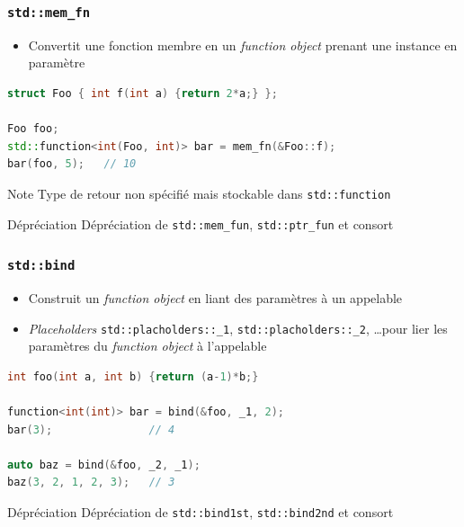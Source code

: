 \documentclass[C++.tex]{subfiles}
\begin{document}
\begin{frame}[fragile]
	\frametitle{\lstinline|std::mem_fn|}
	\begin{itemize}
		\item Convertit une fonction membre en un \textit{function object} prenant une instance en paramètre
	\end{itemize}

	\begin{lstlisting}[language=C++]
struct Foo { int f(int a) {return 2*a;} };

Foo foo;
std::function<int(Foo, int)> bar = mem_fn(&Foo::f);
bar(foo, 5);   // 10\end{lstlisting}

	\begin{block}{Note}
		Type de retour non spécifié mais stockable dans \lstinline|std::function|
	\end{block}

	\begin{block}{Dépréciation}
		Dépréciation de  \lstinline|std::mem_fun|, \lstinline|std::ptr_fun| et consort

	\end{block}
\end{frame}

\begin{frame}[fragile]
	\frametitle{\lstinline|std::bind|}
	\begin{itemize}
		\item Construit un \textit{function object} en liant des paramètres à un appelable
		\item \textit{Placeholders} \lstinline|std::placholders::_1|, \lstinline|std::placholders::_2|, \ldots pour lier les paramètres du \textit{function object} à l'appelable
	\end{itemize}

	\begin{lstlisting}[language=C++]
int foo(int a, int b) {return (a-1)*b;}

function<int(int)> bar = bind(&foo, _1, 2);
bar(3);               // 4

auto baz = bind(&foo, _2, _1);
baz(3, 2, 1, 2, 3);   // 3\end{lstlisting}	


	\begin{block}{Dépréciation}
		Dépréciation de \lstinline|std::bind1st|, \lstinline|std::bind2nd| et consort

	\end{block}
\end{frame}
\end{document}

